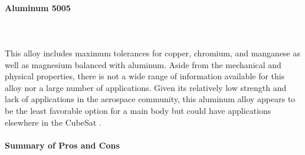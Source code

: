 \paragraph{Aluminum 5005} ~\\~\\
This alloy includes maximum tolerances for copper, chromium, and manganese as well as magnesium balanced with aluminum. Aside from the mechanical and physical properties, there is not a wide range of information available for this alloy nor a large number of applications. Given its relatively low strength and lack of applications in the aerospace community, this aluminum alloy appears to be the least favorable option for a main body but could have applications elsewhere in the CubeSat \cite{ASM}.
%
\paragraph{Summary of Pros and Cons}\hspace{1cm} 
